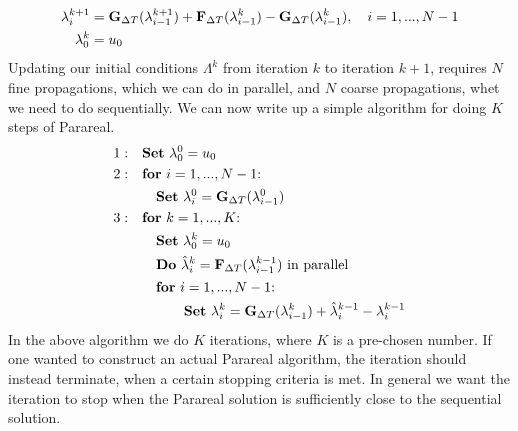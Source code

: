 \begin{align}
\lambda_{i}^{k+1} &= \bold G_ {\Delta T}(\lambda_{i-1}^{k+1})+\bold F_ {\Delta T}( \lambda_{i-1}^{k})-\bold G_ {\Delta T}( \lambda_{i-1}^{k}), \quad i=1,...,N-1 \label{pred_corr_PR} \\
\lambda_0^k &= u_0
\end{align}
Updating our initial conditions $\Lambda^k$ from iteration $k$ to iteration $k+1$, requires $N$ fine propagations, which we can do in parallel, and $N$ coarse propagations, whet we need to do sequentially. We can now write up a simple algorithm for doing $K$ steps of Parareal.
\begin{align*}
1:\quad&\textrm{$\bold{Set}$ $\lambda_0^0=u_0$} \\
2:\quad&\textrm{$\bold{for}$ $i=1,...,N-1$:} \\
&\quad\bold{Set} \ \lambda_i^0=\bold G_ {\Delta T}(\lambda_{i-1}^0) \\
3:\quad&\textrm{$\bold{for}$ $k=1,...,K$:} \\
&\quad\textrm{$\bold{Set}$ $\lambda_0^k=u_0$} \\
&\quad\textrm{$\bold{Do}$ $\hat \lambda_i^k=\bold F_ {\Delta T}( \lambda_{i-1}^{k-1})$ in parallel} \\
&\quad\textrm{$\bold{for}$ $i=1,...,N-1$:} \\
&\quad \quad \quad \bold{Set} \ \lambda_{i}^{k} = \bold G_ {\Delta T}(\lambda_{i-1}^{k})+\hat\lambda_i^{k-1}-\lambda_i^{k-1}
\end{align*}
In the above algorithm we do $K$ iterations, where $K$ is a pre-chosen number. If one wanted to construct an actual Parareal algorithm, the iteration should instead terminate, when a certain stopping criteria is met. In general we want the iteration to stop when the Parareal solution is sufficiently close to the sequential solution. 
